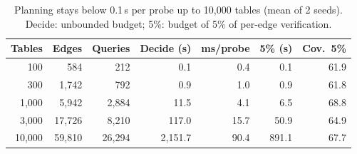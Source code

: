 \begin{table}[t]
\centering
\caption{Planning stays below 0.1\,s per probe up to 10,000 tables (mean of 2 seeds). Decide: unbounded budget; 5\%: budget of 5\% of per-edge verification.}
\label{tab:scale}
\small
\setlength{\tabcolsep}{3pt}
\begin{tabular}{@{}rrrrrrr@{}}
\toprule
Tables & Edges & Queries & Decide (s) & ms/probe & 5\% (s) & Cov.\ 5\% \\
\midrule
100 & 584 & 212 & 0.1 & 0.4 & 0.1 & 61.9 \\
300 & 1,742 & 792 & 0.9 & 1.0 & 0.9 & 61.8 \\
1,000 & 5,942 & 2,884 & 11.5 & 4.1 & 6.5 & 68.8 \\
3,000 & 17,726 & 8,210 & 117.0 & 15.7 & 50.9 & 64.9 \\
10,000 & 59,810 & 26,294 & 2,151.7 & 90.4 & 891.1 & 67.7 \\
\bottomrule
\end{tabular}
\end{table}
